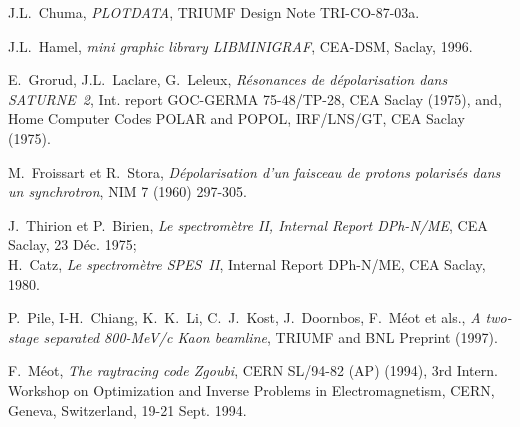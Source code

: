 \begin{thebibliography}{99}
 J.L.~Chuma, \textsl{PLOTDATA}, TRIUMF Design Note TRI-CO-87-03a.

 J.L.~Hamel, \textsl{mini graphic library LIBMINIGRAF}, CEA-DSM, Saclay, 1996.

 E.~Grorud, J.L.~Laclare, G.~Leleux, 
\textsl{R\'esonances de d\'epolarisation dans SATURNE~2}, 
Int. report GOC-GERMA 75-48/TP-28, CEA Saclay (1975), 
and, Home Computer Codes POLAR and POPOL, IRF/LNS/GT, CEA Saclay (1975).

 M.~Froissart et R.~Stora, 
\textsl{D\'epolarisation d'un faisceau de protons polaris\'es dans un synchrotron},
 NIM 7 (1960) 297-305.

 J.~Thirion et P.~Birien, 
\textsl{Le spectrom\`etre II, Internal Report DPh-N/ME}, 
CEA Saclay, 23 D\'ec. 1975; \\
H.~Catz, \textsl{Le spectrom\`etre SPES~II}, Internal Report DPh-N/ME, CEA Saclay, 1980. 

  P.~Pile, I-H.~Chiang, K.~K.~Li, C.~J.~Kost, J.~Doornbos, F.~M\'eot et als., 
\textsl{A two-stage separated 800-MeV/c Kaon beamline}, 
 TRIUMF and BNL Preprint (1997).

 F.~M\'eot, 
\textsl{The raytracing code Zgoubi}, CERN SL/94-82 (AP) (1994), 
3rd Intern. Workshop on Optimization and Inverse Problems 
in Electromagnetism, CERN, Geneva, Switzerland, 19-21 Sept. 1994. 


\end{thebibliography}

